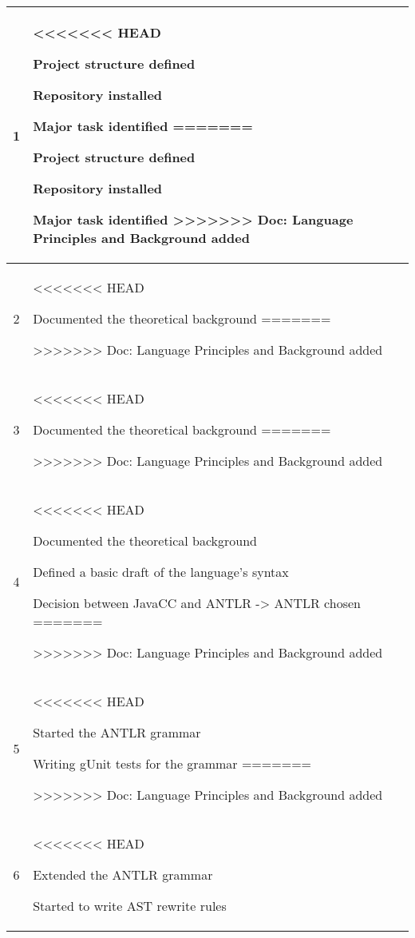 \begin{center}
\begin{longtable}{|c|p{12cm}|}
1 & 
\begin{journal}
<<<<<<< HEAD
	\item Project structure defined
	\item Repository installed
	\item Major task identified
=======
  \item Project structure defined
  \item Repository installed
  \item Major task identified
>>>>>>> Doc: Language Principles and Background added
\end{journal}
\\ \hline
2 & 
\begin{journal}
<<<<<<< HEAD
	\item Documented the theoretical background
=======
  \item 
>>>>>>> Doc: Language Principles and Background added
\end{journal}
\\ \hline
3 & 
\begin{journal}
<<<<<<< HEAD
	\item Documented the theoretical background
=======
  \item 
>>>>>>> Doc: Language Principles and Background added
\end{journal}
\\ \hline
4 & 
\begin{journal}
<<<<<<< HEAD
	\item Documented the theoretical background
	\item Defined a basic draft of the language's syntax
	\item Decision between JavaCC and ANTLR -> ANTLR chosen
=======
  \item 
>>>>>>> Doc: Language Principles and Background added
\end{journal}
\\ \hline
5 & 
\begin{journal}
<<<<<<< HEAD
	\item Started the ANTLR grammar
	\item Writing gUnit tests for the grammar
=======
  \item 
>>>>>>> Doc: Language Principles and Background added
\end{journal}
\\ \hline
6 & 
\begin{journal}
<<<<<<< HEAD
	\item Extended the ANTLR grammar
	\item Started to write AST rewrite rules

\end{journal}
\end{longtable}
\end{center}
